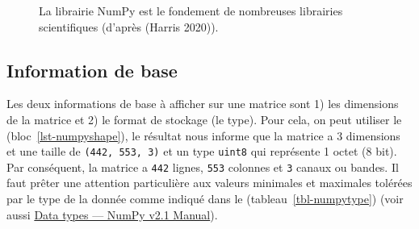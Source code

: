 \documentclass[
  11pt,
  letterpaper,
  open=any,
  twoside=false,
  french]{scrbook}
\begin{document}
\begin{figure}


\caption{\label{fig-naturenumpy1}La librairie NumPy est le fondement de
nombreuses librairies scientifiques (d'après (Harris 2020)).}

\end{figure}%

\subsection{Information de base}\label{information-de-base}

Les deux informations de base à afficher sur une matrice sont 1) les
dimensions de la matrice et 2) le format de stockage (le type). Pour
cela, on peut utiliser le (bloc~\ref{lst-numpyshape}), le résultat nous
informe que la matrice a 3 dimensions et une taille de
\texttt{(442,\ 553,\ 3)} et un type \texttt{uint8} qui représente 1
octet (8 bit). Par conséquent, la matrice a \texttt{442} lignes,
\texttt{553} colonnes et \texttt{3} canaux ou bandes. Il faut prêter une
attention particulière aux valeurs minimales et maximales tolérées par
le type de la donnée comme indiqué dans le (tableau~\ref{tbl-numpytype})
(voir aussi
\href{https://numpy.org/doc/stable/user/basics.types.html}{Data types
--- NumPy v2.1 Manual}).
\end{document}
